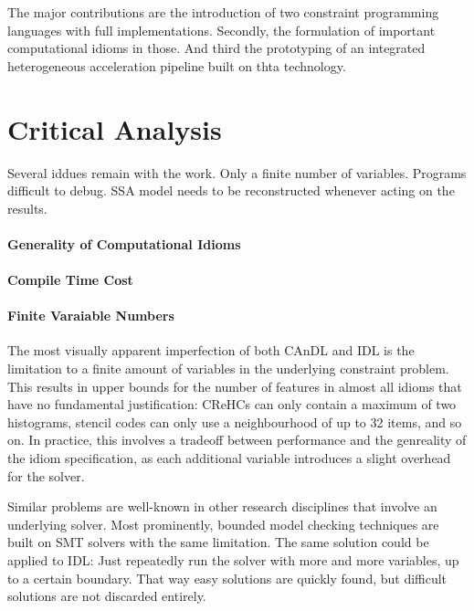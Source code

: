     The major contributions are the introduction of two constraint programming
    languages with full implementations.
    Secondly, the formulation of important computational idioms in those.
    And third the prototyping of an integrated heterogeneous acceleration
    pipeline built on thta technology.

\section{Critical Analysis}

    Several iddues remain with the work.
    Only a finite number of variables.
    Programs difficult to debug.
    SSA model needs to be reconstructed whenever acting on the results.

    \paragraph*{Generality of Computational Idioms}
    

    \paragraph*{Compile Time Cost}

    \paragraph*{Finite Varaiable Numbers}
    The most visually apparent imperfection of both CAnDL and IDL is the
    limitation to a finite amount of variables in the underlying constraint
    problem.
    This results in upper bounds for the number of features in almost all idioms
    that have no fundamental justification:
    CReHCs can only contain a maximum of two histograms, stencil codes can only
    use a neighbourhood of up to 32 items, and so on.
    In practice, this involves a tradeoff between performance and the genreality
    of the idiom specification, as each additional variable introduces a slight
    overhead for the solver.

    Similar problems are well-known in other research disciplines that involve
    an underlying solver.
    Most prominently, bounded model checking techniques are built on SMT solvers
    with the same limitation.
    The same solution could be applied to IDL: Just repeatedly run the solver
    with more and more variables, up to a certain boundary.
    That way easy solutions are quickly found, but difficult solutions are not
    discarded entirely.

